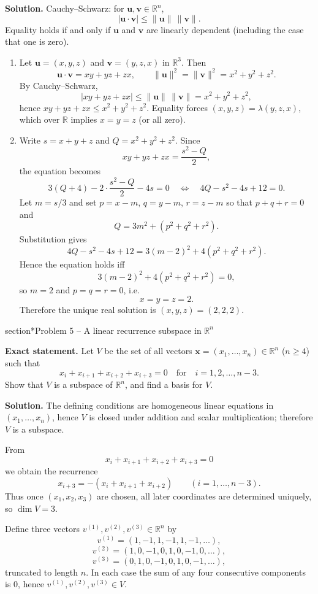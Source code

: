 \documentclass[12pt,a4paper]{article}
\theoremstyle{plain}
\theoremstyle{definition}      %
\begin{document}
\textbf{Solution.}
Cauchy--Schwarz: for $\mathbf u,\mathbf v\in\mathbb{R}^n$,
\[
|\mathbf u\cdot \mathbf v|\le \|\mathbf u\|\,\|\mathbf v\|.
\]
Equality holds if and only if $\mathbf u$ and $\mathbf v$ are linearly dependent (including the case that one is zero).

\begin{enumerate}[label=(\alph*)]
	\item Let $\mathbf u=(x,y,z)$ and $\mathbf v=(y,z,x)$ in $\mathbb{R}^3$. Then
	\[
	\mathbf u\cdot\mathbf v=xy+yz+zx,\qquad
	\|\mathbf u\|^2=\|\mathbf v\|^2=x^2+y^2+z^2.
	\]
	By Cauchy--Schwarz,
	\[
	|xy+yz+zx|\le \|\mathbf u\|\,\|\mathbf v\|=x^2+y^2+z^2,
	\]
	hence $xy+yz+zx\le x^2+y^2+z^2$.
	Equality forces $(x,y,z)=\lambda(y,z,x)$, which over $\mathbb{R}$ implies $x=y=z$ (or all zero).
	\item Write $s=x+y+z$ and $Q=x^2+y^2+z^2$. Since
	\[
	xy+yz+zx=\frac{s^2-Q}{2},
	\]
	the equation becomes
	\[
	3(Q+4)-2\cdot\frac{s^2-Q}{2}-4s=0
	\quad\Longleftrightarrow\quad
	4Q-s^2-4s+12=0.
	\]
	Let $m=s/3$ and set $p=x-m$, $q=y-m$, $r=z-m$ so that $p+q+r=0$ and
	\[
	Q=3m^2+(p^2+q^2+r^2).
	\]
	Substitution gives
	\[
	4Q-s^2-4s+12
	=3(m-2)^2+4(p^2+q^2+r^2).
	\]
	Hence the equation holds iff
	\[
	3(m-2)^2+4(p^2+q^2+r^2)=0,
	\]
	so $m=2$ and $p=q=r=0$, i.e.
	\[
	x=y=z=2.
	\]
	Therefore the unique real solution is $(x,y,z)=(2,2,2)$.
\end{enumerate}

section*{Problem 5 -- A linear recurrence subspace in $\mathbb{R}^n$}

\textbf{Exact statement.}
Let $V$ be the set of all vectors $\mathbf{x}=(x_1,\dots,x_n)\in\mathbb{R}^n$ ($n\ge 4$) such that
\[
x_i+x_{i+1}+x_{i+2}+x_{i+3}=0
\quad\text{for}\quad i=1,2,\dots,n-3.
\]
Show that $V$ is a subspace of $\mathbb{R}^n$, and find a basis for $V$.

\textbf{Solution.}
The defining conditions are homogeneous linear equations in $(x_1,\dots,x_n)$, hence $V$ is closed under addition and scalar multiplication; therefore $V$ is a subspace.

From
\[
x_i+x_{i+1}+x_{i+2}+x_{i+3}=0
\]
we obtain the recurrence
\[
x_{i+3}=-(x_i+x_{i+1}+x_{i+2})
\qquad (i=1,\dots,n-3).
\]
Thus once $(x_1,x_2,x_3)$ are chosen, all later coordinates are determined uniquely, so $\dim V=3$.

Define three vectors $v^{(1)},v^{(2)},v^{(3)}\in\mathbb{R}^n$ by
\[
v^{(1)}=(1,-1,1,-1,1,-1,\dots),
\]
\[
v^{(2)}=(1,0,-1,0,1,0,-1,0,\dots),
\]
\[
v^{(3)}=(0,1,0,-1,0,1,0,-1,\dots),
\]
truncated to length $n$. In each case the sum of any four consecutive components is $0$, hence $v^{(1)},v^{(2)},v^{(3)}\in V$.
\end{document}
